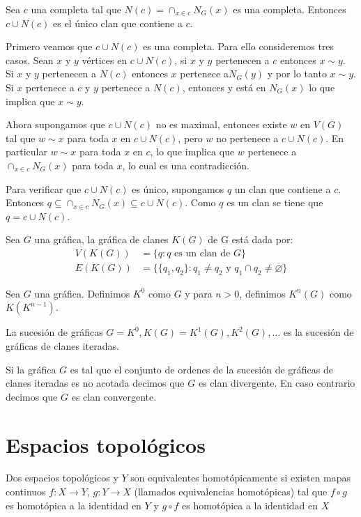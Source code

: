 \begin{Prop}
Sea $c$ una completa tal que $N(c) = \cap_{x\in c}N_G(x)$ es una completa. Entonces $c\cup N(c)$ es el único clan que contiene a $c$.
\end{Prop}
\begin{Dem}
Primero veamos que $c\cup N(c)$ es una completa. Para ello consideremos tres casos. Sean $x$ y $y$ vértices en $c\cup N(c)$, si $x$ y $y$ pertenecen a $c$ entonces $x\sim y$. Si $x$ y $y$ pertenecen a $N(c)$ entonces $x$ pertenece a$ N_G(y)$ y por lo tanto $x\sim y$. Si $x$ pertenece a $c$ y $y$ pertenece a $N(c)$, entonces y está en $N_G(x)$ lo que implica que $x\sim y$. 

Ahora supongamos que $c\cup N(c)$  no es maximal, entonces existe $w$ en $V(G)$ tal que $w\sim x$ para toda $x$ en $c\cup N(c)$, pero $w$ no pertenece a $c\cup N(c)$. En particular $w\sim x$ para toda $x$ en $c$, lo que implica que $w$ pertenece a $\cap_{x\in c}N_G(x)$ para toda $x$, lo cual es una contradicción.

Para verificar que $c\cup N(c)$ es único, supongamos $q$ un clan que contiene a $c$. Entonces $q\subseteq \cap_{x\in c}N_G(x)\subseteq c\cup N(c) $. Como $q$ es un clan se tiene que $q = c\cup N(c)$.
\end{Dem}

\begin{Defi}
Sea $G$ una gráfica, la gráfica de clanes $K(G)$ de G está dada por:
\begin{align*}
V(K(G))&=\{q: q \text{ es un clan de } G\} \\
E(K(G))&=\{\{q_1,q_2\}: q_1\neq q_2 \text{ y } q_1\cap q_2 \neq \varnothing \}
\end{align*}
\end{Defi}

\begin{Defi}
Sea $G$ una gráfica. Definimos $K^{0}$ como $G$ y para $n>0$, definimos $K^n(G)$ como $K(K^{n-1})$.

La sucesión de gráficas $G = K^{0}, K(G) = K^1(G), K^2(G),\ldots$ es la sucesión de gráficas de clanes iteradas. 
\end{Defi}

\begin{Defi}
Si la gráfica $G$ es tal que el conjunto de ordenes de la sucesión de gráficas de clanes iteradas es no acotada decimos que $G$ es clan divergente.
En caso contrario decimos que $G$ es clan convergente.
\end{Defi}
\section{Espacios topológicos}
\begin{Defi}
Dos espacios topológicos  y $Y$ son equivalentes homotópicamente
si existen mapas continuos  $f\colon X\rightarrow Y$, $g\colon Y\rightarrow X$ (llamados equivalencias homotópicas) tal que $f\circ g$ es homotópica a la identidad en $Y$ y $g\circ f$ es homotópica a la identidad en $X$
\end{Defi}

